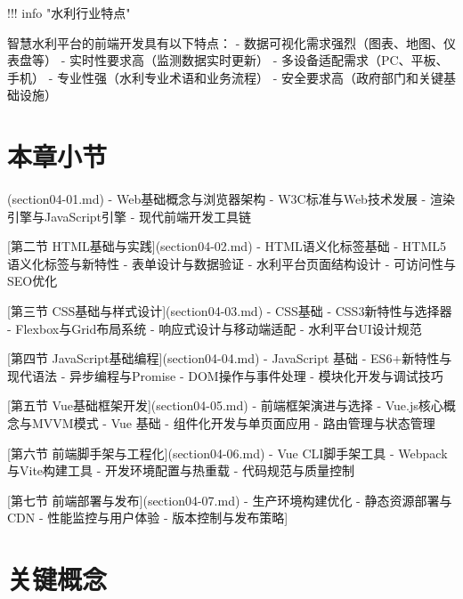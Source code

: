 \begin{tcolorbox}[colback=orange!5!white,colframe=orange!75!black,title=Warning 技术更新说明
    
    前端技术发展迅速，本章内容基于2024年的技术标准编写。在实际开发中，请关注相关技术的最新发展动态，适时更新技术选型和开发方案。]
!!! info "水利行业特点"
    
    智慧水利平台的前端开发具有以下特点：
    - 数据可视化需求强烈（图表、地图、仪表盘等）
    - 实时性要求高（监测数据实时更新）
    - 多设备适配需求（PC、平板、手机）
    - 专业性强（水利专业术语和业务流程）
    - 安全要求高（政府部门和关键基础设施）
\end{tcolorbox}

\section{本章小节}

\begin{tcolorbox}[colback=cyan!5!white,colframe=cyan!75!black,title=Info 章节结构
    
     [第一节 前端及前端开发工具](section04-01.md)
    - Web基础概念与浏览器架构
    - W3C标准与Web技术发展
    - 渲染引擎与JavaScript引擎
    - 现代前端开发工具链
    
     [第二节 HTML基础与实践](section04-02.md)
    - HTML语义化标签基础
    - HTML5语义化标签与新特性
    - 表单设计与数据验证
    - 水利平台页面结构设计
    - 可访问性与SEO优化
    
     [第三节 CSS基础与样式设计](section04-03.md)
    - CSS基础
    - CSS3新特性与选择器
    - Flexbox与Grid布局系统
    - 响应式设计与移动端适配
    - 水利平台UI设计规范
    
     [第四节 JavaScript基础编程](section04-04.md)
    - JavaScript 基础
    - ES6+新特性与现代语法
    - 异步编程与Promise
    - DOM操作与事件处理
    - 模块化开发与调试技巧
    
     [第五节 Vue基础框架开发](section04-05.md)
    - 前端框架演进与选择
    - Vue.js核心概念与MVVM模式
    - Vue 基础
    - 组件化开发与单页面应用
    - 路由管理与状态管理
    
     [第六节 前端脚手架与工程化](section04-06.md)
    - Vue CLI脚手架工具
    - Webpack与Vite构建工具
    - 开发环境配置与热重载
    - 代码规范与质量控制
    
     [第七节 前端部署与发布](section04-07.md)
    - 生产环境构建优化
    - 静态资源部署与CDN
    - 性能监控与用户体验
    - 版本控制与发布策略]
\section{关键概念}

\end{tcolorbox}


